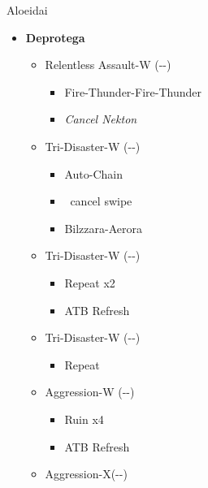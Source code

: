\renewcommand{\first}{[1]Aggression-X(\com-\com-\nek)}
\renewcommand{\second}{[2] Aggression-W (\com-\com-\nek)}
\renewcommand{\third}{[3] Relentless Assault-W (\rav-\com-\nek)}
\renewcommand{\fourth}{[4] Patient Probing-W (\sen-\sen-\nek)}
\renewcommand{\fifth}{[5] Tri-Disaster-W (\rav-\rav-\nek)}
\renewcommand{\sixth}{[6] Tri-Disaster-W (\rav-\rav-\nek)}
\begin{battle}{Aloeidai}
	\begin{flushleft}
		\begin{itemize}
			\item \textbf{Deprotega}
			      \begin{itemize}
				      \item \third
				            \begin{itemize}
					            \item Fire-Thunder-Fire-Thunder
					            \item \textit{Cancel Nekton}
				            \end{itemize}
				      \item \fifth
				            \begin{itemize}
					            \item Auto-Chain
					            \item \stagger\ cancel swipe
					            \item Bilzzara-Aerora
				            \end{itemize}
				      \item \sixth
				            \begin{itemize}
					            \item Repeat x2
					            \item ATB Refresh
				            \end{itemize}
				      \item \fifth
				            \begin{itemize}
					            \item Repeat
				            \end{itemize}
				      \item \second
				            \begin{itemize}
					            \item Ruin x4
					            \item ATB Refresh
				            \end{itemize}
				      \item \first
				            \begin{itemize}

\end{itemize}
\end{itemize}
\end{itemize}
\end{flushleft}
\end{battle}
